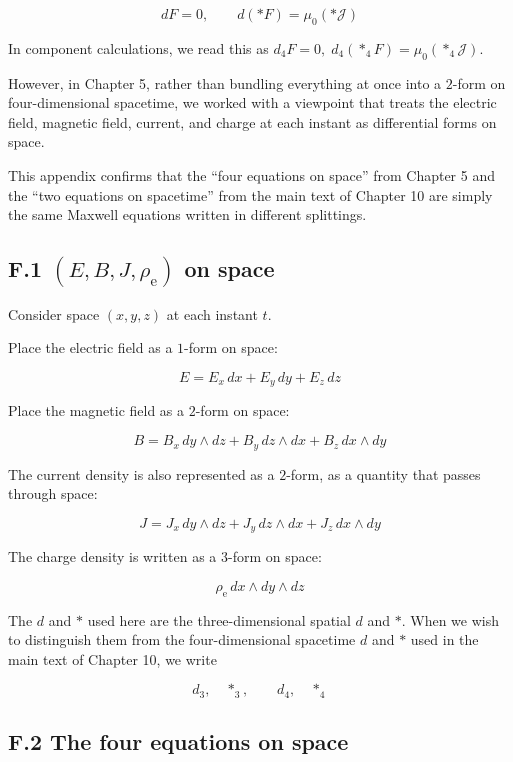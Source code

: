 \[
dF=0,
\qquad
d(\ast F)=\mu_0(\ast\mathcal{J})
\]

In component calculations, we read this as
\(d_4F=0,\;d_4(\ast_4F)=\mu_0(\ast_4\mathcal J)\).

However, in Chapter 5, rather than bundling everything at once into a
\(2\)-form on four-dimensional spacetime, we worked with a viewpoint
that treats the electric field, magnetic field, current, and charge at
each instant as differential forms on space.

This appendix confirms that the ``four equations on space'' from Chapter
5 and the ``two equations on spacetime'' from the main text of Chapter
10 are simply the same Maxwell equations written in different
splittings.

\hypertarget{f.1-ebjrho_mathrm-e-on-space}{%
\subsection{\texorpdfstring{F.1 \((E,B,J,\rho_{\mathrm e})\) on
space}{F.1 (E,B,J,\textbackslash rho\_\{\textbackslash mathrm e\}) on space}}\label{f.1-ebjrho_mathrm-e-on-space}}

Consider space \((x,y,z)\) at each instant \(t\).

Place the electric field as a \(1\)-form on space:

\[
E = E_x\,dx + E_y\,dy + E_z\,dz
\]

Place the magnetic field as a \(2\)-form on space:

\[
B = B_x\,dy\wedge dz + B_y\,dz\wedge dx + B_z\,dx\wedge dy
\]

The current density is also represented as a \(2\)-form, as a quantity
that passes through space:

\[
J = J_x\,dy\wedge dz + J_y\,dz\wedge dx + J_z\,dx\wedge dy
\]

The charge density is written as a \(3\)-form on space:

\[
\rho_{\mathrm e}\,dx\wedge dy\wedge dz
\]

The \(d\) and \(\ast\) used here are the three-dimensional spatial \(d\)
and \(\ast\). When we wish to distinguish them from the four-dimensional
spacetime \(d\) and \(\ast\) used in the main text of Chapter 10, we
write

\[
d_3,\quad \ast_3,
\qquad
d_4,\quad \ast_4
\]

\hypertarget{f.2-the-four-equations-on-space}{%
\subsection{F.2 The four equations on
space}\label{f.2-the-four-equations-on-space}}

